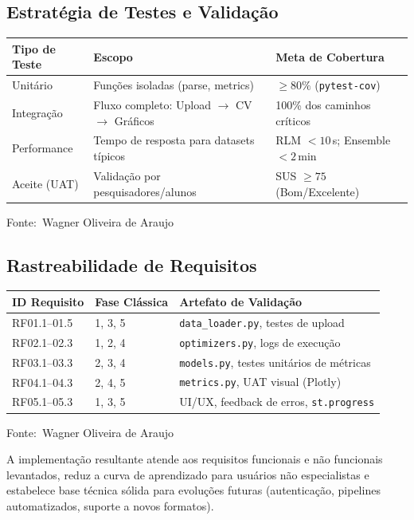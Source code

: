 \documentclass[12pt,a4paper]{article}
\newcommand{\oautor}{Wagner Oliveira de Araujo}
\begin{document}
\subsection{Estratégia de Testes e Validação}

\begin{quadro}[ht]
\centering
\small
\caption{Estratégia de testes e critérios de aceite}
\label{quadro:testes}
\begin{threeparttable}
\begin{tabularx}{\textwidth}{|l|X|X|} \hline
\textbf{Tipo de Teste} & \textbf{Escopo} & \textbf{Meta de Cobertura} \\ \hline
Unitário & Funções isoladas (parse, metrics) & $\ge 80\%$ (\texttt{pytest-cov}) \\ \hline
Integração & Fluxo completo: Upload $\rightarrow$ CV $\rightarrow$ Gráficos & 100\% dos caminhos críticos \\ \hline
Performance & Tempo de resposta para datasets típicos & RLM $< 10\,$s; Ensemble $< 2\,$min \\ \hline
Aceite (UAT) & Validação por pesquisadores/alunos & SUS $\ge 75$ (Bom/Excelente) \\ \hline
\end{tabularx}
\begin{tablenotes}[flushleft]
\footnotesize
\item Fonte:~\oautor
\end{tablenotes}
\end{threeparttable}
\end{quadro}

\subsection{Rastreabilidade de Requisitos}

\begin{quadro}[ht]
\centering
\small
\caption{Matriz de rastreabilidade de requisitos (RTM)}
\label{quadro:rtm}
\begin{threeparttable}
\begin{tabularx}{\textwidth}{|l|l|X|} \hline
\textbf{ID Requisito} & \textbf{Fase Clássica} & \textbf{Artefato de Validação} \\ \hline
RF01.1--01.5 & 1, 3, 5 & \texttt{data\_loader.py}, testes de upload \\ \hline
RF02.1--02.3 & 1, 2, 4 & \texttt{optimizers.py}, logs de execução \\ \hline
RF03.1--03.3 & 2, 3, 4 & \texttt{models.py}, testes unitários de métricas \\ \hline
RF04.1--04.3 & 2, 4, 5 & \texttt{metrics.py}, UAT visual (Plotly) \\ \hline
RF05.1--05.3 & 1, 3, 5 & UI/UX, feedback de erros, \texttt{st.progress} \\ \hline
\end{tabularx}
\begin{tablenotes}[flushleft]
\footnotesize
\item Fonte:~\oautor
\end{tablenotes}
\end{threeparttable}
\end{quadro}

A implementação resultante atende aos requisitos funcionais e não funcionais levantados, reduz a curva de aprendizado para usuários não especialistas e estabelece base técnica sólida para evoluções futuras (autenticação, pipelines automatizados, suporte a novos formatos).
\end{document}
